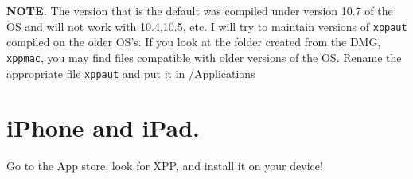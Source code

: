 \documentclass{article}
\begin{document}
{\bf NOTE.} The version that is the default was compiled under version
10.7 of the OS and will not work with 10.4,10.5, etc. I will try to
maintain versions of {\tt xppaut} compiled on the older OS's. If you
look at the folder created from the DMG, {\tt xppmac}, you may find
 files compatible with older versions of the OS. Rename the appropriate  file  {\tt xppaut} and put it in /Applications




\section{iPhone and iPad.}
Go to the App store, look for XPP, and install it on your device!
\end{document}
